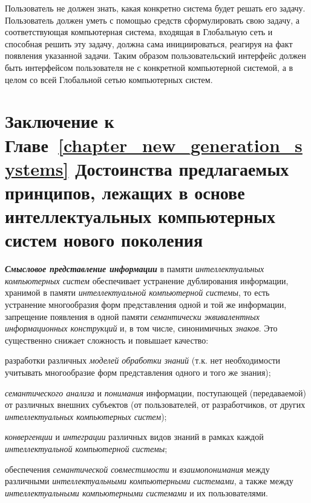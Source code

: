 Пользователь не должен знать, какая конкретно система будет решать его задачу. Пользователь должен уметь с помощью  средств сформулировать свою задачу, а соответствующая компьютерная система, входящая в Глобальную сеть и способная решить эту задачу, должна сама инициироваться, реагируя на факт появления указанной задачи. Таким образом пользовательский интерфейс должен быть интерфейсом пользователя не с конкретной компьютерной системой, а в целом со всей Глобальной сетью компьютерных систем. 

\section*{Заключение к Главе~\ref{chapter_new_generation_systems} Достоинства предлагаемых принципов, лежащих в основе интеллектуальных компьютерных систем нового поколения}
\label{sec_ngics_advant}

\textbf{\textit{Смысловое представление информации}} в памяти \textit{интеллектуальных компьютерных систем} обеспечивает устранение дублирования информации, хранимой в памяти \textit{интеллектуальной компьютерной системы}, то есть устранение многообразия форм представления одной и той же информации, запрещение появления в одной памяти \textit{семантически эквивалентных информационных конструкций} и, в том числе, синонимичных \textit{знаков}. Это существенно снижает сложность и повышает качество:

\begin{textitemize}
	\item разработки различных \textit{моделей обработки знаний} (т.к. нет необходимости учитывать многообразие форм представления одного и того же знания);
	\item \textit{семантического анализа} и \textit{понимания} информации, поступающей (передаваемой) от различных внешних субъектов (от пользователей, от разработчиков, от других \textit{интеллектуальных компьютерных систем});
	\item \textit{конвергенции} и \textit{интеграции} различных видов знаний в рамках каждой \textit{интеллектуальной компьютерной системы};
	\item обеспечения \textit{семантической совместимости} и \textit{взаимопонимания} между различными \textit{интеллектуальными компьютерными системами}, а также между \textit{интеллектуальными компьютерными системами} и их пользователями.
\end{textitemize}

